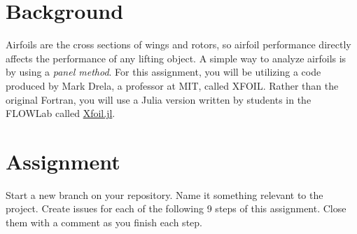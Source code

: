 \documentclass[12pt]{article}
\begin{document}
\section{Background}

Airfoils are the cross sections of wings and rotors, so airfoil performance directly affects the performance of any lifting object.
A simple way to analyze airfoils is by using a \textit{panel method}. 
For this assignment, you will be utilizing a code produced by Mark Drela, a professor at MIT, called XFOIL.  Rather than the original Fortran, you will use a Julia version written by students in the FLOWLab called \href{https://github.com/byuflowlab/Xfoil.jl}{Xfoil.jl}.


\section{Assignment}

Start a new branch on your repository. Name it something relevant to the project. Create issues for each of the following 9 steps of this assignment. Close them with a comment as you finish each step. 
\end{document}
